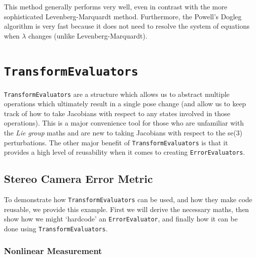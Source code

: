 \documentclass[10pt,letterpaper,fleqn,oneside]{article}
\newcommand{\code}[1]{\texttt{#1}}
\begin{document}
This method generally performs very well, even in contrast with the more sophisticated Levenberg-Marquardt method.
Furthermore, the Powell's Dogleg algorithm is very fast because it does not need to resolve the system of equations when $\lambda$ changes (unlike Levenberg-Marquardt).

%
%
\section{\code{TransformEvaluators}}
\label{sec:evals}

\code{TransformEvaluators} are a structure which allows us to abstract multiple operations which ultimately result in a single pose change (and allow us to keep track of how to take Jacobians with respect to any states involved in those operations). 
This is a major convenience tool for those who are unfamiliar with the \emph{Lie group} maths and are new to taking Jacobians with respect to the se(3) perturbations. 
The other major benefit of \code{TransformEvaluators} is that it provides a high level of reusability when it comes to creating \code{ErrorEvaluators}.

\subsection{Stereo Camera Error Metric}

To demonstrate how \code{TransformEvaluators} can be used, and how they make code reusable, we provide this example.
First we will derive the necessary maths, then show how we might `hardcode' an \code{ErrorEvaluator}, and finally how it can be done using \code{TransformEvaluators}.

\subsubsection{Nonlinear Measurement}
\end{document}
